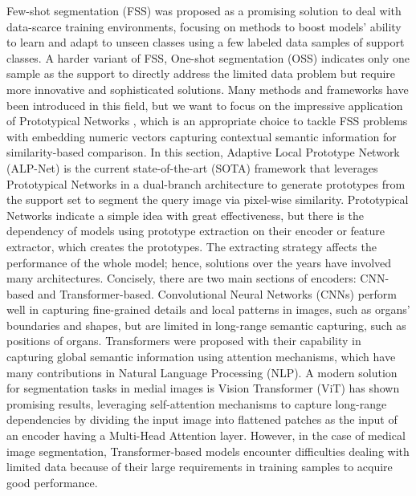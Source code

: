 Few-shot segmentation (FSS) was proposed as a promising solution to deal with data-scarce training environments, focusing on methods to boost models' ability to learn and adapt to unseen classes using a few labeled data samples of support classes. A harder variant of FSS, One-shot segmentation (OSS) indicates only one sample as the support to directly address the limited data problem but require more innovative and sophisticated solutions. Many methods and frameworks have been introduced in this field, but we want to focus on the impressive application of Prototypical Networks \cite{snell2017prototypical}, which is an appropriate choice to tackle FSS problems with embedding numeric vectors capturing contextual semantic information for similarity-based comparison. In this section, Adaptive Local Prototype Network (ALP-Net) \cite{ouyang2020self} is the current state-of-the-art (SOTA) framework that leverages Prototypical Networks in a dual-branch architecture to generate prototypes from the support set to segment the query image via pixel-wise similarity. Prototypical Networks indicate a simple idea with great effectiveness, but there is the dependency of models using prototype extraction \cite{wang2019panet, ouyang2020self,manna2024correlation,huang2023rethinking} on their encoder or feature extractor, which creates the prototypes. The extracting strategy affects the performance of the whole model; hence, solutions over the years have involved many architectures. Concisely, there are two main sections of encoders: CNN-based and Transformer-based. Convolutional Neural Networks (CNNs) \cite{goodfellow2016convolutional} perform well in capturing fine-grained details and local patterns in images, such as organs' boundaries and shapes, but are limited in long-range semantic capturing, such as positions of organs. Transformers \cite{vaswani2023attentionneed} were proposed with their capability in capturing global semantic information using attention mechanisms, which have many contributions in Natural Language Processing (NLP). A modern solution for segmentation tasks in medial images is Vision Transformer (ViT) \cite{dosovitskiy2020image} has shown promising results, leveraging self-attention mechanisms to capture long-range dependencies by dividing the input image into flattened patches as the input of an encoder having a Multi-Head Attention layer. However, in the case of medical image segmentation, Transformer-based models encounter difficulties dealing with limited data because of their large requirements in training samples to acquire good performance.

